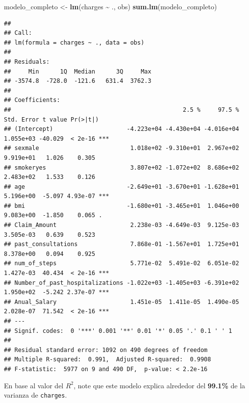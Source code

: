 \documentclass[
]{article}
\newenvironment{Shaded}{\begin{snugshade}}{\end{snugshade}}
\newcommand{\AttributeTok}[1]{\textcolor[rgb]{0.13,0.29,0.53}{#1}}
\newcommand{\DecValTok}[1]{\textcolor[rgb]{0.00,0.00,0.81}{#1}}
\newcommand{\FloatTok}[1]{\textcolor[rgb]{0.00,0.00,0.81}{#1}}
\newcommand{\FunctionTok}[1]{\textcolor[rgb]{0.13,0.29,0.53}{\textbf{#1}}}
\newcommand{\NormalTok}[1]{#1}
\newcommand{\OtherTok}[1]{\textcolor[rgb]{0.56,0.35,0.01}{#1}}
\newcommand{\SpecialCharTok}[1]{\textcolor[rgb]{0.81,0.36,0.00}{\textbf{#1}}}
\newcommand{\StringTok}[1]{\textcolor[rgb]{0.31,0.60,0.02}{#1}}
\begin{document}
\begin{Shaded}
\begin{Highlighting}[]
\NormalTok{modelo\_completo }\OtherTok{\textless{}{-}} \FunctionTok{lm}\NormalTok{(charges }\SpecialCharTok{\textasciitilde{}}\NormalTok{ ., obs)}
\FunctionTok{sum.lm}\NormalTok{(modelo\_completo)}
\end{Highlighting}
\end{Shaded}

\begin{verbatim}
## 
## Call:
## lm(formula = charges ~ ., data = obs)
## 
## Residuals:
##     Min      1Q  Median      3Q     Max 
## -3574.8  -728.0  -121.6   631.4  3762.3 
## 
## Coefficients:
##                                                 2.5 %     97.5 % Std. Error t value Pr(>|t|)    
## (Intercept)                     -4.223e+04 -4.430e+04 -4.016e+04  1.055e+03 -40.029  < 2e-16 ***
## sexmale                          1.018e+02 -9.310e+01  2.967e+02  9.919e+01   1.026    0.305    
## smokeryes                        3.807e+02 -1.072e+02  8.686e+02  2.483e+02   1.533    0.126    
## age                             -2.649e+01 -3.670e+01 -1.628e+01  5.196e+00  -5.097 4.93e-07 ***
## bmi                             -1.680e+01 -3.465e+01  1.046e+00  9.083e+00  -1.850    0.065 .  
## Claim_Amount                     2.238e-03 -4.649e-03  9.125e-03  3.505e-03   0.639    0.523    
## past_consultations               7.868e-01 -1.567e+01  1.725e+01  8.378e+00   0.094    0.925    
## num_of_steps                     5.771e-02  5.491e-02  6.051e-02  1.427e-03  40.434  < 2e-16 ***
## Number_of_past_hospitalizations -1.022e+03 -1.405e+03 -6.391e+02  1.950e+02  -5.242 2.37e-07 ***
## Anual_Salary                     1.451e-05  1.411e-05  1.490e-05  2.028e-07  71.542  < 2e-16 ***
## ---
## Signif. codes:  0 '***' 0.001 '**' 0.01 '*' 0.05 '.' 0.1 ' ' 1
## 
## Residual standard error: 1092 on 490 degrees of freedom
## Multiple R-squared:  0.991,  Adjusted R-squared:  0.9908 
## F-statistic:  5977 on 9 and 490 DF,  p-value: < 2.2e-16
\end{verbatim}

En base al valor del \(R^2\), note que este modelo explica alrededor del
\textbf{99.1\%} de la varianza de \texttt{charges}.

\begin{Shaded}
\end{Shaded}
\end{document}
